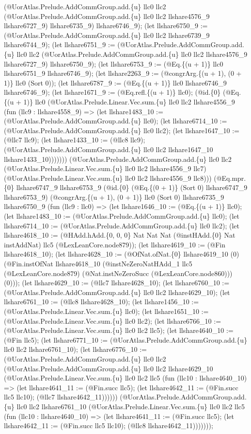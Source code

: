 \documentclass[11pt]{article}
\begin{document}
(@UorAtlas.Prelude.AddCommGroup.add.\{u\} llc0 llc2 (@UorAtlas.Prelude.AddCommGroup.add.\{u\} llc0 llc2 llshare4576\_9 llshare6727\_9) llshare6735\_9) llshare6746\_9); (let llshare6750\_9 := (@UorAtlas.Prelude.AddCommGroup.add.\{u\} llc0 llc2 llshare6739\_9 llshare6744\_9); (let llshare6751\_9 := (@UorAtlas.Prelude.AddCommGroup.add.\{u\} llc0 llc2 (@UorAtlas.Prelude.AddCommGroup.add.\{u\} llc0 llc2 llshare4576\_9 llshare6727\_9) llshare6750\_9); (let llshare6753\_9 := (@Eq.\{(u + 1)\} llc0 llshare6751\_9 llshare6746\_9); (let llshare2263\_9 := (@congrArg.\{(u + 1), (0 + 1)\} llc0 (Sort 0)); (let llshare6787\_9 := (@Eq.\{(u + 1)\} llc0 llshare6746\_9 llshare6746\_9); (let llshare1671\_9 := (@Eq.refl.\{(u + 1)\} llc0); (@id.\{0\} (@Eq.\{(u + 1)\} llc0 (@UorAtlas.Prelude.Linear.Vec.sum.\{u\} llc0 llc2 llshare4556\_9 (fun (llc9 : llshare4558\_9) => (let llshare1483\_10 := (@UorAtlas.Prelude.AddCommGroup.add.\{u\} llc0); (let llshare6714\_10 := (@UorAtlas.Prelude.AddCommGroup.add.\{u\} llc0 llc2); (let llshare1647\_10 := (@llc7 llc9); (let llshare1433\_10 := (@llc8 llc9); (@UorAtlas.Prelude.AddCommGroup.add.\{u\} llc0 llc2 llshare1647\_10 llshare1433\_10))))))) (@UorAtlas.Prelude.AddCommGroup.add.\{u\} llc0 llc2 (@UorAtlas.Prelude.Linear.Vec.sum.\{u\} llc0 llc2 llshare4556\_9 llc7) (@UorAtlas.Prelude.Linear.Vec.sum.\{u\} llc0 llc2 llshare4556\_9 llc8))) (@Eq.mpr.\{0\} llshare6747\_9 llshare6753\_9 (@id.\{0\} (@Eq.\{(0 + 1)\} (Sort 0) llshare6747\_9 llshare6753\_9) (@congrArg.\{(u + 1), (0 + 1)\} llc0 (Sort 0) llshare6735\_9 llshare6750\_9 (fun (llc9 : llc0) => (let llshare1646\_10 := (@Eq.\{(u + 1)\} llc0); (let llshare1483\_10 := (@UorAtlas.Prelude.AddCommGroup.add.\{u\} llc0); (let llshare6714\_10 := (@UorAtlas.Prelude.AddCommGroup.add.\{u\} llc0 llc2); (let llshare4618\_10 := (@HAdd.hAdd.\{0, 0, 0\} Nat Nat Nat (@instHAdd.\{0\} Nat instAddNat) llc5 (@LexLeanCore.node879)); (let llshare4619\_10 := (@Fin llshare4618\_10); (let llshare4628\_10 := (@OfNat.ofNat.\{0\} llshare4619\_10 (0) (@Fin.instOfNat llshare4618\_10 (@instNeZeroNatHAdd\_1 llc5 (@LexLeanCore.node879) (@Nat.instNeZeroSucc (@LexLeanCore.node860))) (0))); (let llshare4629\_10 := (@llc7 llshare4628\_10); (let llshare6760\_10 := (@UorAtlas.Prelude.AddCommGroup.add.\{u\} llc0 llc2 llshare4629\_10); (let llshare6761\_10 := (@llc8 llshare4628\_10); (let llshare1456\_10 := (@UorAtlas.Prelude.Linear.Vec.sum.\{u\} llc0); (let llshare1651\_10 := (@UorAtlas.Prelude.Linear.Vec.sum.\{u\} llc0 llc2); (let llshare6766\_10 := (@UorAtlas.Prelude.Linear.Vec.sum.\{u\} llc0 llc2 llc5); (let llshare4640\_10 := (@Fin llc5); (let llshare6771\_10 := (@UorAtlas.Prelude.AddCommGroup.add.\{u\} llc0 llc2 llshare6761\_10); (let llshare6776\_10 := (@UorAtlas.Prelude.AddCommGroup.add.\{u\} llc0 llc2 (@UorAtlas.Prelude.AddCommGroup.add.\{u\} llc0 llc2 llshare4629\_10 (@UorAtlas.Prelude.Linear.Vec.sum.\{u\} llc0 llc2 llc5 (fun (llc10 : llshare4640\_10) => (let llshare4641\_11 := (@Fin.succ llc5); (let llshare4642\_11 := (@Fin.succ llc5 llc10); (@llc7 llshare4642\_11)))))) (@UorAtlas.Prelude.AddCommGroup.add.\{u\} llc0 llc2 llshare6761\_10 (@UorAtlas.Prelude.Linear.Vec.sum.\{u\} llc0 llc2 llc5 (fun (llc10 : llshare4640\_10) => (let llshare4641\_11 := (@Fin.succ llc5); (let llshare4642\_11 := (@Fin.succ llc5 llc10); (@llc8 llshare4642\_11))))))); 
\end{document}
